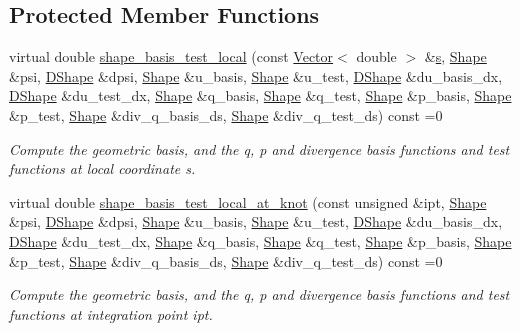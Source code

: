 \subsection*{Protected Member Functions}
\begin{DoxyCompactItemize}
\item 
virtual double \hyperlink{classoomph_1_1AxisymmetricPoroelasticityEquations_a5514cde6de162cc6eb49fd9e5844500d}{shape\+\_\+basis\+\_\+test\+\_\+local} (const \hyperlink{classoomph_1_1Vector}{Vector}$<$ double $>$ \&\hyperlink{cfortran_8h_ab7123126e4885ef647dd9c6e3807a21c}{s}, \hyperlink{classoomph_1_1Shape}{Shape} \&psi, \hyperlink{classoomph_1_1DShape}{D\+Shape} \&dpsi, \hyperlink{classoomph_1_1Shape}{Shape} \&u\+\_\+basis, \hyperlink{classoomph_1_1Shape}{Shape} \&u\+\_\+test, \hyperlink{classoomph_1_1DShape}{D\+Shape} \&du\+\_\+basis\+\_\+dx, \hyperlink{classoomph_1_1DShape}{D\+Shape} \&du\+\_\+test\+\_\+dx, \hyperlink{classoomph_1_1Shape}{Shape} \&q\+\_\+basis, \hyperlink{classoomph_1_1Shape}{Shape} \&q\+\_\+test, \hyperlink{classoomph_1_1Shape}{Shape} \&p\+\_\+basis, \hyperlink{classoomph_1_1Shape}{Shape} \&p\+\_\+test, \hyperlink{classoomph_1_1Shape}{Shape} \&div\+\_\+q\+\_\+basis\+\_\+ds, \hyperlink{classoomph_1_1Shape}{Shape} \&div\+\_\+q\+\_\+test\+\_\+ds) const =0
\begin{DoxyCompactList}\small\item\em Compute the geometric basis, and the q, p and divergence basis functions and test functions at local coordinate s. \end{DoxyCompactList}\item 
virtual double \hyperlink{classoomph_1_1AxisymmetricPoroelasticityEquations_a3e0f7b110f60d59bc047d9686de47111}{shape\+\_\+basis\+\_\+test\+\_\+local\+\_\+at\+\_\+knot} (const unsigned \&ipt, \hyperlink{classoomph_1_1Shape}{Shape} \&psi, \hyperlink{classoomph_1_1DShape}{D\+Shape} \&dpsi, \hyperlink{classoomph_1_1Shape}{Shape} \&u\+\_\+basis, \hyperlink{classoomph_1_1Shape}{Shape} \&u\+\_\+test, \hyperlink{classoomph_1_1DShape}{D\+Shape} \&du\+\_\+basis\+\_\+dx, \hyperlink{classoomph_1_1DShape}{D\+Shape} \&du\+\_\+test\+\_\+dx, \hyperlink{classoomph_1_1Shape}{Shape} \&q\+\_\+basis, \hyperlink{classoomph_1_1Shape}{Shape} \&q\+\_\+test, \hyperlink{classoomph_1_1Shape}{Shape} \&p\+\_\+basis, \hyperlink{classoomph_1_1Shape}{Shape} \&p\+\_\+test, \hyperlink{classoomph_1_1Shape}{Shape} \&div\+\_\+q\+\_\+basis\+\_\+ds, \hyperlink{classoomph_1_1Shape}{Shape} \&div\+\_\+q\+\_\+test\+\_\+ds) const =0
\begin{DoxyCompactList}\small\item\em Compute the geometric basis, and the q, p and divergence basis functions and test functions at integration point ipt. \end{DoxyCompactList}\item 

\end{DoxyCompactItemize}
